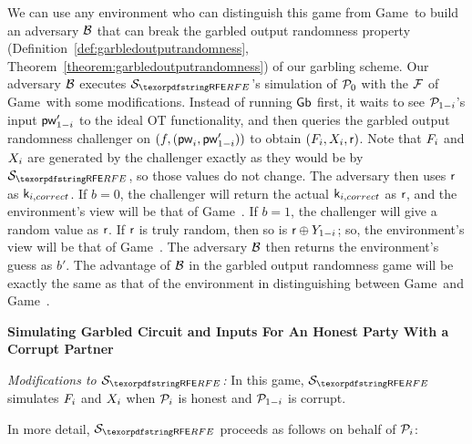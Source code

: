 \begin{games}
We can use any environment who can distinguish this game from Game~\previousgame to build an adversary $\mathcal{B}$ that can break the garbled output randomness property (Definition~\ref{def:garbledoutputrandomness}, Theorem~\ref{theorem:garbledoutputrandomness}) of our garbling scheme.
Our adversary $\mathcal{B}$ executes $\SimYGCRFE$'s simulation of $\mathcal{P}_{0}$ with the $\mathcal{F}$ of Game~\previousgame with some modifications.
Instead of running $\mathsf{Gb}$ first, it waits to see $\mathcal{P}_{1-i}$'s input $\mathsf{pw}_{1-i}'$ to the ideal OT functionality, and then queries the garbled output randomness challenger on $(f, (\mathsf{pw}_{i}, \mathsf{pw}_{1-i}'))$ to obtain $(F_{i}, X_{i}, \mathsf{r})$.
Note that $F_{i}$ and $X_{i}$ are generated by the challenger exactly as they would be by $\SimYGCRFE$, so those values do not change. 
The adversary then uses $\mathsf{r}$ as $\mathsf{k}_{i, correct}$.
If $b = 0$, the challenger will return the actual $\mathsf{k}_{i, correct}$ as $\mathsf{r}$, and the environment's view will be that of Game~\previousgame.
If $b = 1$, the challenger will give a random value as $\mathsf{r}$.
If $\mathsf{r}$ is truly random, then so is $\mathsf{r} \oplus Y_{1-i}$; so, the environment's view will be that of Game~\thisgame.
The adversary $\mathcal{B}$ then returns the environment's guess as $b'$.
The advantage of $\mathcal{B}$ in the garbled output randomness game will be exactly the same as that of the environment in distinguishing between Game~\previousgame and Game~\thisgame.

\textbf{Simulating Garbled Circuit and Inputs For An Honest Party With a Corrupt Partner}

\textit{Modifications to $\SimYGCRFE$:}
In this game, $\SimYGCRFE$ simulates $F_{i}$ and $X_{i}$ when $\mathcal{P}_{i}$ is honest and $\mathcal{P}_{1-i}$ is corrupt. 

In more detail, $\SimYGCRFE$ proceeds as follows on behalf of $\mathcal{P}_{i}$:


\end{games}
